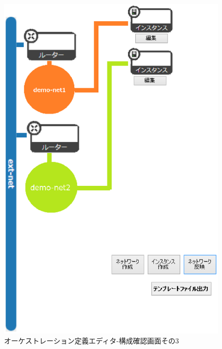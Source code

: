 \documentclass[mingoth]{kut-paper}		%
\begin{document}
		\begin{figure}[H]
			\begin{center}
				\includegraphics[scale=0.55]{Document/構成確認画面3.eps}
				\caption{オーケストレーション定義エディタ-構成確認画面その3}
				\label{pic:3}
			\end{center}
		\end{figure}
		
\end{document}
